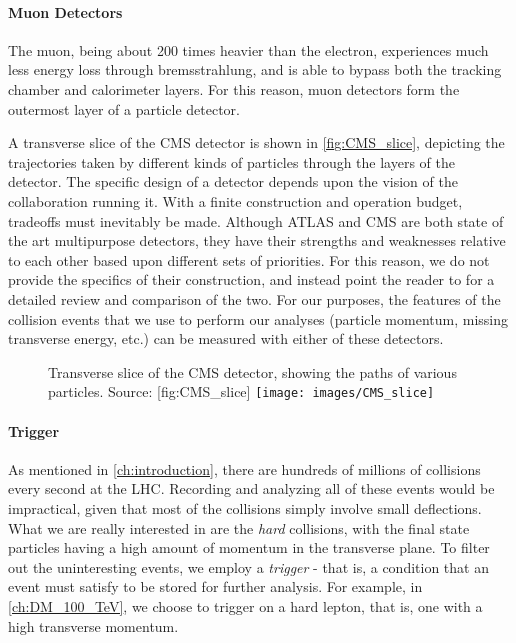 \paragraph{Muon Detectors} The muon, being about 200 times heavier than the electron, experiences much less energy loss through bremsstrahlung, and is able to bypass both the tracking chamber and calorimeter layers. For this reason, muon detectors form the outermost layer of a particle detector.

A transverse slice of the CMS detector is shown in \autoref{fig:CMS_slice}, depicting the trajectories taken by different kinds of particles through the layers of the detector.
The specific design of a detector depends upon the vision of the collaboration running it. With a finite construction and operation budget, tradeoffs must inevitably be made. Although ATLAS and CMS are both state of the art multipurpose detectors, they have their strengths and weaknesses relative to each other based upon different sets of priorities. For this reason, we do not provide the specifics of their construction, and instead point the reader to \citep{Froidevaux2006} for a detailed review and comparison of the two.
For our purposes, the features of the collision events that we use to perform our analyses (particle momentum, missing transverse energy, etc.) can be measured with either of these detectors.
\begin{figure}
  \begin{sidecaption}
    {Transverse slice of the CMS detector, showing the paths of various particles. Source: \citep{CMS_Slice}}[fig:CMS_slice]
    \centering
    \texttt{[image: images/CMS\_slice]}
  \end{sidecaption}
\end{figure}
\paragraph{Trigger} As mentioned in \autoref{ch:introduction}, there are hundreds of millions of collisions every second at the LHC. Recording and analyzing all of these events would be impractical, given that most of the collisions simply involve small deflections. What we are really interested in are the \emph{hard} collisions, with the final state particles having a high amount of momentum in the transverse plane. To filter out the uninteresting events, we employ a \emph{trigger} - that is, a condition that an event must satisfy to be stored for further analysis. For example, in \autoref{ch:DM_100_TeV}, we choose to trigger on a hard lepton, that is, one with a high transverse momentum.
